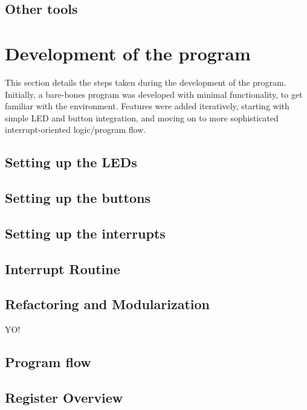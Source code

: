     \subsection{Other tools}

        

\section{Development of the program}

This section details the steps taken during the development of the program.
Initially, a bare-bones program was developed with minimal functionality, to get familiar with the environment.
Features were added iteratively, starting with simple LED and button integration, and moving on to more sophisticated interrupt-oriented logic/program flow.

    \subsection{Setting up the LEDs}
        
        

    \subsection{Setting up the buttons}

        

    \subsection{Setting up the interrupts}

        

    \subsection{Interrupt Routine}

        

    \subsection{Refactoring and Modularization}

        YO!

    \subsection{Program flow}

        

    \subsection{Register Overview}

        

